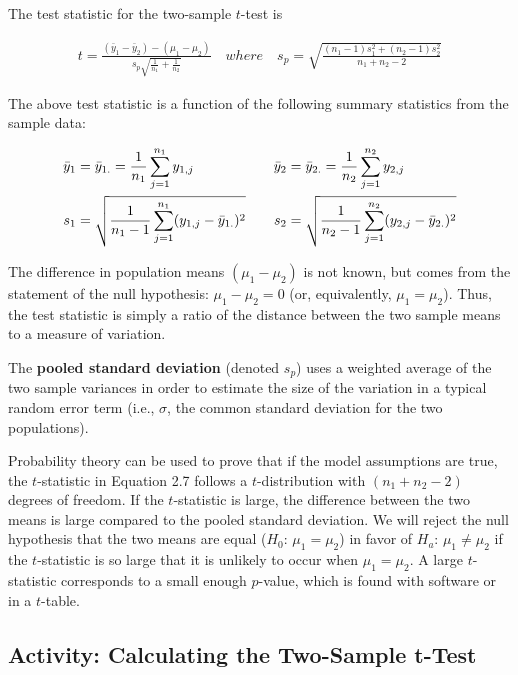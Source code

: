 \documentclass[
]{book}
\begin{document}
The test statistic for the two-sample \(t\)-test is

\begin{align} 
\label{2.7}
t = \frac{(\bar{y}_1 - \bar{y}_2) - (\mu_1 - \mu_2)}{s_p\sqrt{\frac{1}{n_1} + \frac{1}{n_2}}} 
\quad where \quad
s_p = \sqrt{\frac{(n_1-1)s_1^2 + (n_2-1)s_2^2}{n_1 + n_2 - 2}}
\tag{2.7}
\end{align}

The above test statistic is a function of the following summary statistics from the sample data:

\begin{align}
\bar{y}_1 &= \bar{y}_{1.} = \frac{1}{n_1}\sum_{j=1}^{n_1}y_{1,j} 
& \quad 
\bar{y}_2 &= \bar{y}_{2.} = \frac{1}{n_2}\sum_{j=1}^{n_2}y_{2,j} \\
s_1 &= \sqrt{\frac{1}{n_1 - 1}\sum_{j=1}^{n_1}(y_{1,j} - \bar{y}_{1.})^2} 
& \quad 
s_2 &= \sqrt{\frac{1}{n_2 - 1}\sum_{j=1}^{n_2}(y_{2,j} - \bar{y}_{2.})^2}
\notag
\end{align}

The difference in population means \((\mu_1 - \mu_2)\) is not known, but comes from the statement of the null hypothesis: \(\mu_1 - \mu_2 = 0\) (or, equivalently, \(\mu_1 = \mu_2\)). Thus, the test statistic is simply a ratio of the distance between the two sample means to a measure of variation.

The \textbf{pooled standard deviation} (denoted \(s_p\)) uses a weighted average of the two sample variances in order to estimate the size of the variation in a typical random error term (i.e., \(\sigma\), the common standard deviation for the two populations).

Probability theory can be used to prove that if the model assumptions are true, the \(t\)-statistic in Equation 2.7 follows a \(t\)-distribution with \((n_1 + n_2 - 2)\) degrees of freedom. If the \(t\)-statistic is large, the difference between the two means is large compared to the pooled standard deviation. We will reject the null hypothesis that the two means are equal (\(H_0\): \(\mu_1 = \mu_2\)) in favor of \(H_a\): \(\mu_1 \ne \mu_2\) if the \(t\)-statistic is so large that it is unlikely to occur when \(\mu_1 = \mu_2\). A large \(t\)-statistic corresponds to a small enough \(p\)-value, which is found with software or in a \(t\)-table.

\hypertarget{activity-calculating-the-two-sample-t-test}{%
\subsection*{Activity: Calculating the Two-Sample t-Test}\label{activity-calculating-the-two-sample-t-test}}
\end{document}
